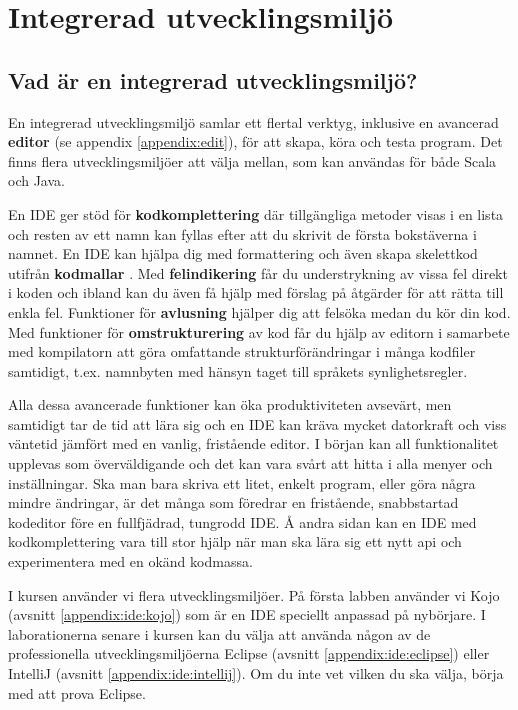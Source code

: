 
\chapter{Integrerad utvecklingsmiljö}\label{appendix:ide}

\section{Vad är en integrerad utvecklingsmiljö?}

En integrerad utvecklingsmiljö  samlar ett flertal verktyg, inklusive en avancerad \textbf{editor} (se appendix \ref{appendix:edit}), för att skapa, köra och testa program. Det finns flera utvecklingsmiljöer att välja mellan, som kan användas för både Scala och Java.

En IDE ger stöd för \textbf{kodkomplettering}  där tillgängliga metoder visas i en lista och resten av ett namn kan fyllas efter att du skrivit de första bokstäverna i namnet. En IDE kan hjälpa dig med formattering och även skapa skelettkod utifrån \textbf{kodmallar} . Med \textbf{felindikering}  får du understrykning av vissa fel direkt i koden och ibland kan du även få hjälp med förslag på åtgärder för att rätta till enkla fel. Funktioner för \textbf{avlusning}  hjälper dig att felsöka medan du kör din kod. Med funktioner för \textbf{omstrukturering}  av kod får du hjälp av editorn i samarbete med kompilatorn att göra omfattande strukturförändringar i många kodfiler samtidigt, t.ex. namnbyten med hänsyn taget till språkets synlighetsregler.  

Alla dessa avancerade funktioner kan öka produktiviteten avsevärt, men samtidigt tar de tid att lära sig och en IDE kan kräva mycket datorkraft och viss väntetid jämfört med en vanlig, fristående editor. I början kan all funktionalitet upplevas som överväldigande och det kan vara svårt att hitta i alla menyer och inställningar. Ska man bara skriva ett litet, enkelt program, eller göra några mindre ändringar, är det många som föredrar en fristående, snabbstartad kodeditor före en fullfjädrad, tungrodd IDE. Å andra sidan kan en IDE med kodkomplettering vara till stor hjälp när man ska lära sig ett nytt api och experimentera med en okänd kodmassa.

I kursen använder vi flera utvecklingsmiljöer. På första labben använder vi Kojo (avsnitt \ref{appendix:ide:kojo}) som är en IDE speciellt anpassad på nybörjare. I laborationerna senare i kursen kan du välja att använda någon av de professionella utvecklingsmiljöerna Eclipse (avsnitt \ref{appendix:ide:eclipse}) eller IntelliJ (avsnitt \ref{appendix:ide:intellij}). Om du inte vet vilken du ska välja, börja med att prova Eclipse.



